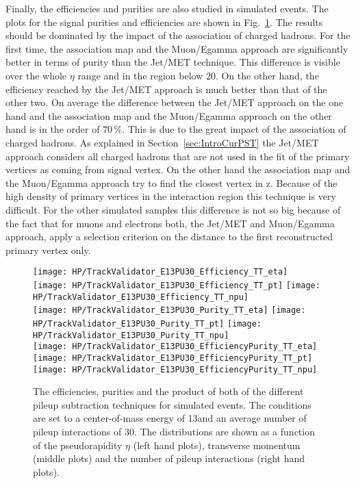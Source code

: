Finally, the efficiencies and purities are also studied in simulated \ttbar events. The plots for the signal purities and efficiencies are shown in Fig.~\ref{plot:HPUTAE13PU30TTComp}. The results should be dominated by the impact of the association of charged hadrons. For the first time, the association map and the Muon/Egamma approach are significantly better in terms of purity  than the Jet/MET technique. This difference is visible over the whole $\eta$ range and in the \pt{} region below 20\GeV{}. On the other hand, the efficiency reached by the Jet/MET approach is much better than that of the other two. On average the difference between the Jet/MET approach on the one hand and the association map and the Muon/Egamma approach on the other hand is in the order of $70\,\%$. This is due to the great impact of the association of charged hadrons. As explained in Section~\ref{sec:IntroCurPST} the Jet/MET approach considers all charged hadrons that are not used in the fit of the primary vertices as coming from signal vertex. On the other hand the association map and the Muon/Egamma approach try to find the closest vertex in z. Because of the high density of primary vertices in the interaction region this technique is very difficult. For the other simulated samples this difference is not so big because of the fact that for muons and electrons both, the Jet/MET and Muon/Egamma approach, apply a selection criterion on the distance to the first reconstructed primary vertex only.

\begin{figure}[!t]
  \centering
  \texttt{[image: HP/TrackValidator\_E13PU30\_Efficiency\_TT\_eta]}
  \texttt{[image: HP/TrackValidator\_E13PU30\_Efficiency\_TT\_pt]}
  \texttt{[image: HP/TrackValidator\_E13PU30\_Efficiency\_TT\_npu]}
   \\
  \texttt{[image: HP/TrackValidator\_E13PU30\_Purity\_TT\_eta]}
  \texttt{[image: HP/TrackValidator\_E13PU30\_Purity\_TT\_pt]}
  \texttt{[image: HP/TrackValidator\_E13PU30\_Purity\_TT\_npu]}
   \\
  \texttt{[image: HP/TrackValidator\_E13PU30\_EfficiencyPurity\_TT\_eta]}
  \texttt{[image: HP/TrackValidator\_E13PU30\_EfficiencyPurity\_TT\_pt]}
  \texttt{[image: HP/TrackValidator\_E13PU30\_EfficiencyPurity\_TT\_npu]}
  \caption[Purities, efficiencies and their product of the different pileup subtraction techniques based on simulated \ttbar events with 13\TeV and $\left<PU\right>=30$]{The efficiencies, purities and the product of both of the different pileup subtraction techniques for simulated \ttbar events. The conditions are set to a center-of-mass energy of 13\TeV and an average number of pileup interactions of 30. The distributions are shown as a function of the pseudorapidity $\eta$ (left hand plots), transverse momentum (middle plots) and the number of pileup interactions (right hand plots). \label{plot:HPUTAE13PU30TTComp}}
\end{figure}

